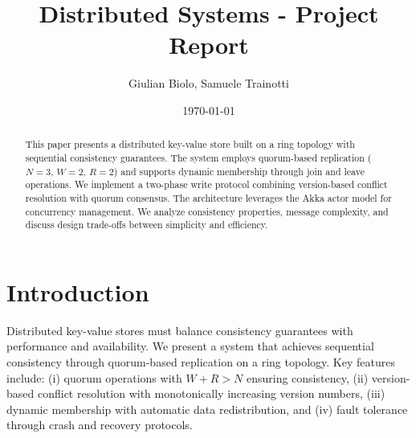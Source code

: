 \documentclass{article}
\title{Distributed Systems - Project Report}
\author{Giulian Biolo, Samuele Trainotti}
\date{\today}
\begin{document}
\maketitle

\begin{abstract}
This paper presents a distributed key-value store built on a ring topology with sequential consistency guarantees. The system employs quorum-based replication ($N=3$, $W=2$, $R=2$) and supports dynamic membership through join and leave operations. We implement a two-phase write protocol combining version-based conflict resolution with quorum consensus. The architecture leverages the Akka actor model for concurrency management. We analyze consistency properties, message complexity, and discuss design trade-offs between simplicity and efficiency.
\end{abstract}

\section{Introduction}
Distributed key-value stores must balance consistency guarantees with performance and availability. We present a system that achieves sequential consistency through quorum-based replication on a ring topology. Key features include: (i) quorum operations with $W + R > N$ ensuring consistency, (ii) version-based conflict resolution with monotonically increasing version numbers, (iii) dynamic membership with automatic data redistribution, and (iv) fault tolerance through crash and recovery protocols.
\end{document}
